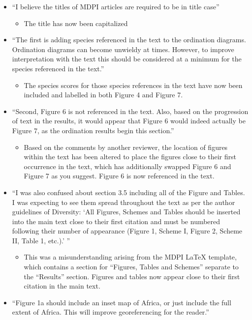 \documentclass[a4paper]{letter}
\begin{document}
\begin{letter}{}
\begin{itemize}
	\item{``I believe the titles of MDPI articles are required to be in title case''}
		\begin{itemize}
			\item{The title has now been capitalized}
		\end{itemize}
	\item{``The first is adding species referenced in the text to the ordination diagrams. Ordination diagrams can become unwieldy at times. However, to improve interpretation with the text this should be considered at a minimum for the species referenced in the text.''}
		\begin{itemize}
			\item{The species scores for those species references in the text have now been included and labelled in both Figure 4 and Figure 7.}
		\end{itemize}
	\item{``Second, Figure 6 is not referenced in the text. Also, based on the progression of text in the results, it would appear that Figure 6 would indeed actually be Figure 7, as the ordination results begin this section.''}
		\begin{itemize}
			\item{Based on the comments by another reviewer, the location of figures within the text has been altered to place the figures close to their first occurrence in the text, which has additionally swapped Figure 6 and Figure 7 as you suggest. Figure 6 is now referenced in the text.}
		\end{itemize}
	\item{``I was also confused about section 3.5 including all of the Figure and Tables. I was expecting to see them spread throughout the text as per the author guidelines of Diversity: `All Figures, Schemes and Tables should be inserted into the main text close to their first citation and must be numbered following their number of appearance (Figure 1, Scheme I, Figure 2, Scheme II, Table 1, etc.).' ''}
		\begin{itemize}
			\item{This was a misunderstanding arising from the MDPI LaTeX template, which contains a section for ``Figures, Tables and Schemes'' separate to the ``Results'' section. Figures and tables now appear close to their first citation in the main text.}
		\end{itemize}
	\item{``Figure 1a should include an inset map of Africa, or just include the full extent of Africa. This will improve georeferencing for the reader.''}

\end{itemize}
\end{letter}
\end{document}
